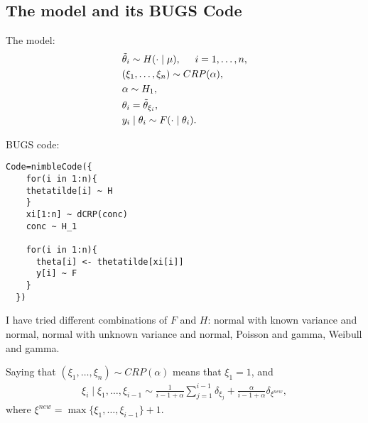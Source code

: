 \documentclass[12pt]{article}
\begin{document}
\subsection{The model and its BUGS Code}
\begin{minipage}{.5\textwidth}
The model:
\begin{align*}
&\tilde{\theta}_i  \sim H(\cdot\mid \mu), \hspace{0.5cm}i=1, \ldots, 	n,\\
&({\xi}_1, \ldots, {\xi}_n) \sim CRP(\alpha),\\
& \alpha \sim H_1,\\ 
&\theta_i= \tilde{\theta}_{{\xi}_i},\\
&y_i\mid \theta_i \sim F(\cdot \mid \theta_i).
\end{align*} 
\end{minipage}
\begin{minipage}{.5\textwidth}
BUGS code:
\begin{verbatim}
Code=nimbleCode({
    for(i in 1:n){ 
    thetatilde[i] ~ H 
    }
    xi[1:n] ~ dCRP(conc)
    conc ~ H_1
    
    for(i in 1:n){
      theta[i] <- thetatilde[xi[i]]
      y[i] ~ F
    }
  })
\end{verbatim} 
\end{minipage}
\vspace{0.5cm}

I have tried different combinations of $F$ and $H$: normal with known variance and normal, normal with unknown variance and normal, Poisson and gamma, Weibull and gamma.

Saying that $({\xi}_1, \ldots, {\xi}_n) \sim CRP(\alpha)$ means that $\xi_1=1$, and
\begin{align*}
\xi_i\mid \xi_1, \ldots, \xi_{i-1} \sim \frac{1}{i-1+\alpha} \sum_{j=1}^{i-1}\delta_{\xi_j} + \frac{\alpha}{i-1+\alpha}\delta_{\xi^{new}}, 
\end{align*}
where $\xi^{new}=\max\{ \xi_1, \ldots, \xi_{i-1}\}+1$.
\end{document}
